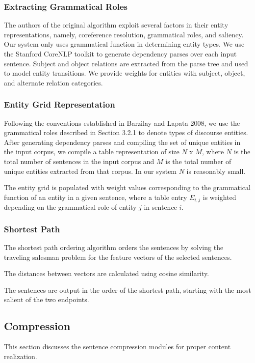 \documentclass[11pt]{article}
\begin{document}
\subsubsection{Extracting Grammatical Roles}
The authors of the original algorithm exploit several factors in their entity representations, namely, coreference resolution, grammatical roles, and saliency. Our system only uses grammatical function in determining entity types. We use the Stanford CoreNLP toolkit to generate dependency parses over each input sentence. Subject and object relations are extracted from the parse tree and used to model entity transitions. We provide weights for entities with subject, object, and alternate relation categories.

\subsubsection{Entity Grid Representation}
Following the conventions established in Barzilay and Lapata 2008, we use the grammatical roles described in Section 3.2.1 to denote types of discourse entities. After generating dependency parses and compiling the set of unique entities in the input corpus, we compile a table representation of size $N$ x $M$, where $N$ is the total number of sentences in the input corpus and $M$ is the total number of unique entities extracted from that corpus. In our system $N$ is reasonably small.

The entity grid is populated with weight values corresponding to the grammatical function of an entity in a given sentence, where a table entry $E_{i,j}$ is weighted depending on the grammatical role of entity $j$ in sentence $i$. 


\subsubsection{Shortest Path}
The shortest path ordering algorithm orders the sentences by solving the traveling salesman problem for the feature vectors of the selected sentences. 

The distances between vectors are calculated using cosine similarity.

The sentences are output in the order of the shortest path, starting with the most salient of the two endpoints.

\subsection{Compression}
This section discusses the sentence compression modules for proper content realization.
\end{document}
